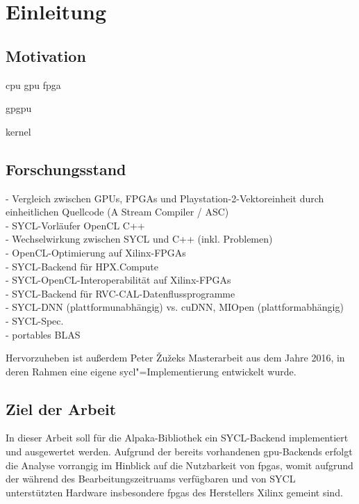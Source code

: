 \chapter{Einleitung}\label{einleitung}

\section{Motivation}\label{einleitung:motivation}

\gls{cpu}
\gls{gpu}
\gls{fpga}

\gls{gpgpu}

\gls{kernel}

\section{Forschungsstand}\label{einleitung:forschung}

\cite{howes2006} - Vergleich zwischen GPUs, FPGAs und Playstation-2-Vektoreinheit durch einheitlichen Quellcode (A Stream Compiler / ASC) \\
\cite{gaster2013} - SYCL-Vorläufer OpenCL C++ \\
\cite{wong2016} - Wechselwirkung zwischen SYCL und C++ (inkl. Problemen) \\
\cite{fifield2016} - OpenCL-Optimierung auf Xilinx-FPGAs \\
\cite{copik2017} - SYCL-Backend für HPX.Compute\\
\cite{doumoulakis2017} - SYCL-OpenCL-Interoperabilität auf Xilinx-FPGAs \\
\cite{krebs2019} - SYCL-Backend für RVC-CAL-Datenflussprogramme \\
\cite{burns2019} - SYCL-DNN (plattformunabhängig) vs. cuDNN, MIOpen (plattformabhängig) \\
\cite{sycl2019} - SYCL-Spec.\\
\cite{rodriguez-gutiez2019} - portables BLAS

Hervorzuheben ist außerdem Peter Žužeks Masterarbeit aus dem Jahre 2016, in
deren Rahmen eine eigene \gls{sycl}"=Implementierung entwickelt wurde. \cite{zuzek2016}

\section{Ziel der Arbeit}\label{einleitung:ziel}

In dieser Arbeit soll für die Alpaka-Bibliothek ein SYCL-Backend implementiert
und ausgewertet werden. Aufgrund der bereits vorhandenen \gls{gpu}-Backends
erfolgt die Analyse vorrangig im Hinblick auf die Nutzbarkeit von \gls{fpga}s,
womit aufgrund der während des Bearbeitungszeitruams verfügbaren und von SYCL
unterstützten Hardware insbesondere \gls{fpga}s des Herstellers Xilinx gemeint
sind.
